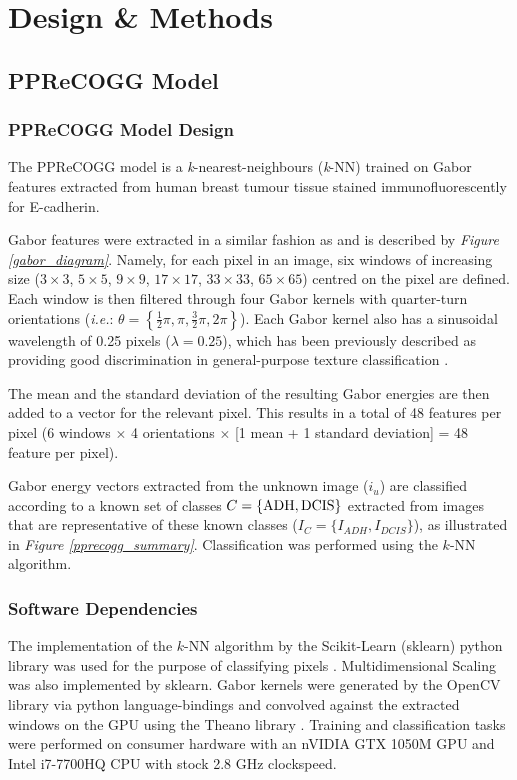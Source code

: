\section{Design \& Methods}
\subsection{PPReCOGG Model}
\subsubsection{PPReCOGG Model Design}
The PPReCOGG model is a \emph{k}-nearest-neighbours (\emph{k}-NN) trained on Gabor features extracted from human breast tumour tissue stained immunofluorescently for E-cadherin.\par

Gabor features were extracted in a similar fashion as \cite{melendez2008} and is described by \emph{Figure \ref{gabor_diagram}}. Namely, for each 
pixel in an image, six windows of increasing size ($3\times3$, $5\times5$, $9\times9$, 
$17\times17$, $33\times33$, $65\times65$) centred on the pixel are defined. 
Each window is then filtered through four Gabor kernels with quarter-turn 
orientations (\emph{i.e.}: $\theta = \left\{\frac{1}{2}\pi, \pi, \frac{3}{2}\pi, 
2\pi \right\}$). Each Gabor kernel also has a sinusoidal wavelength of 0.25 pixels 
($\lambda = 0.25$), which has been previously described as providing good 
discrimination in general-purpose texture classification \citep{manjunath1996}.\par

The mean and the standard deviation of the resulting Gabor energies are then
added to a vector for the relevant pixel. This results in a total of 48 features
per pixel (6 windows $\times$ 4 orientations $\times$ [1 mean + 1 standard deviation] = 48
feature per pixel).\par

Gabor energy vectors extracted from the unknown image ($i_u$) are classified according to a known set of classes $C = \{\textnormal{ADH}, \textnormal{DCIS}\}$ extracted from images that are representative of these known classes ($I_C = \{I_{ADH}, I_{DCIS}\}$), as illustrated in \emph{Figure \ref{pprecogg_summary}}. Classification was performed using the $k$-NN algorithm.

\subsubsection{Software Dependencies}
 The implementation of the $k$-NN algorithm by the Scikit-Learn (sklearn) python library was used for the purpose of classifying pixels \citep{pedregosa2011}. Multidimensional Scaling was also implemented by sklearn. Gabor kernels were generated by the OpenCV library via python language-bindings \citep{opencv_library} and convolved against the extracted windows on the GPU using the Theano library \citep{alrfou2016}. Training and classification tasks were performed on consumer hardware with an nVIDIA GTX 1050M GPU and Intel i7-7700HQ CPU with stock 2.8 GHz clockspeed.\par


